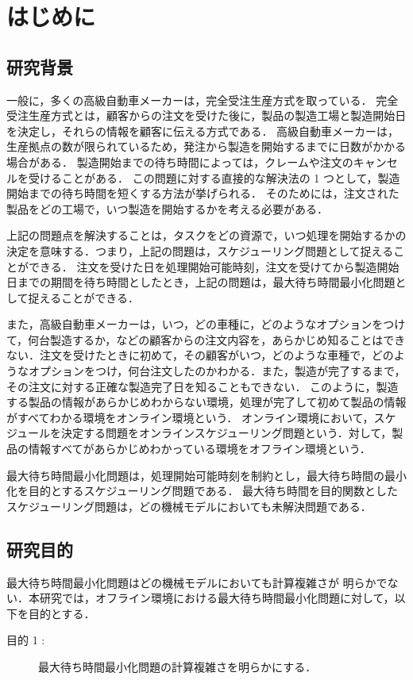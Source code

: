 \documentclass[12pt]{optlab-bachelor}
\begin{document}
\frontmatter

\chapter{はじめに}\label{c_1}
\section{研究背景}

一般に，多くの高級自動車メーカーは，完全受注生産方式を取っている．
完全受注生産方式とは，顧客からの注文を受けた後に，製品の製造工場と製造開始日を決定し，それらの情報を顧客に伝える方式である．
高級自動車メーカーは，生産拠点の数が限られているため，発注から製造を開始するまでに日数がかかる場合がある．
製造開始までの待ち時間によっては，クレームや注文のキャンセルを受けることがある．
この問題に対する直接的な解決法の 1 つとして，製造開始までの待ち時間を短くする方法が挙げられる．
そのためには，注文された製品をどの工場で，いつ製造を開始するかを考える必要がある．

上記の問題点を解決することは，タスクをどの資源で，いつ処理を開始するかの決定を意味する．つまり，上記の問題は，スケジューリング問題として捉えることができる．
注文を受けた日を処理開始可能時刻，注文を受けてから製造開始日までの期間を待ち時間としたとき，上記の問題は，最大待ち時間最小化問題として捉えることができる．

また，高級自動車メーカーは，いつ，どの車種に，どのようなオプションをつけて，何台製造するか，などの顧客からの注文内容を，あらかじめ知ることはできない．注文を受けたときに初めて，その顧客がいつ，どのような車種で，どのようなオプションをつけ，何台注文したのかわかる．また，製造が完了するまで，その注文に対する正確な製造完了日を知ることもできない．
このように，製造する製品の情報があらかじめわからない環境，処理が完了して初めて製品の情報がすべてわかる環境をオンライン環境という．
オンライン環境において，スケジュールを決定する問題をオンラインスケジューリング問題という．対して，製品の情報すべてがあらかじめわかっている環境をオフライン環境という．

最大待ち時間最小化問題は，処理開始可能時刻を制約とし，最大待ち時間の最小化を目的とするスケジューリング問題である．
最大待ち時間を目的関数としたスケジューリング問題は，どの機械モデルにおいても未解決問題である．

\section{研究目的}
最大待ち時間最小化問題はどの機械モデルにおいても計算複雑さが
明らかでない．本研究では，オフライン環境における最大待ち時間最小化問題に対して，以下を目的とする．
\begin{description}
  \item[目的 1 :]
  最大待ち時間最小化問題の計算複雑さを明らかにする．
\end{description}
\end{document}
